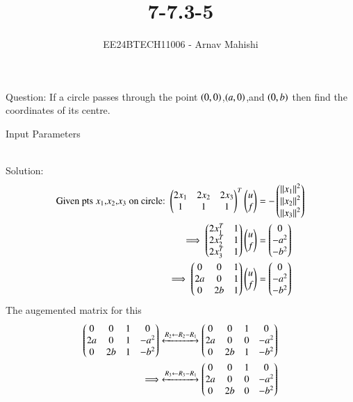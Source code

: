 \documentclass[journal]{IEEEtran}
\begin{document}

\vspace{3cm}

\title{7-7.3-5}
\author{EE24BTECH11006 - Arnav Mahishi}
{\let\newpage\relax\maketitle}

\renewcommand{\thefigure}{\theenumi}
\renewcommand{\thetable}{\theenumi}
\setlength{\intextsep}{10pt} %


\renewcommand{\thetable}{\theenumi}
Question: If a circle passes through the point $\left(0,0\right)$,$\left(a,0\right)$,and $\left(0,b\right)$ then find the coordinates of its centre.\\
\begin{table}[h!]    
  \centering
  
  \caption{Input Parameters}
\end{table}\\
Solution:
\begin{align}
    \text{Given pts $x_1$,$x_2$,$x_3$ on circle: }\begin{pmatrix}2x_1&2x_2&2x_3\\1&1&1\end{pmatrix}^T\begin{pmatrix}u\\f\end{pmatrix}&=-\begin{pmatrix}\left\lVert x_1\right\rVert^2\\\left\lVert x_2\right\rVert^2\\\left\lVert x_3\right\rVert^2\end{pmatrix}\\
    \implies\begin{pmatrix}2x_1^T&1\\2x_2^T&1\\2x_3^T&1\end{pmatrix}\begin{pmatrix}u\\f\end{pmatrix}&=\begin{pmatrix}0\\-a^2\\-b^2\end{pmatrix}\\
    \implies\begin{pmatrix}0&0&1\\2a&0&1\\0&2b&1\end{pmatrix}\begin{pmatrix}u\\f\end{pmatrix}&=\begin{pmatrix}0\\-a^2\\-b^2\end{pmatrix}
\end{align}
The augemented matrix for this
\begin{align}
    \begin{pmatrix}0&0&1&0\\2a&0&1&-a^2\\0&2b&1&-b^2\end{pmatrix}\xleftrightarrow[]{R_2 \leftarrow {R_2-R_1}}\begin{pmatrix}0&0&1&0\\2a&0&0&-a^2\\0&2b&1&-b^2\end{pmatrix}\\
    \implies\xleftrightarrow[]{R_3 \leftarrow {R_3-R_1}}\begin{pmatrix}0&0&1&0\\2a&0&0&-a^2\\0&2b&0&-b^2\end{pmatrix}
\end{align}
\end{document}
